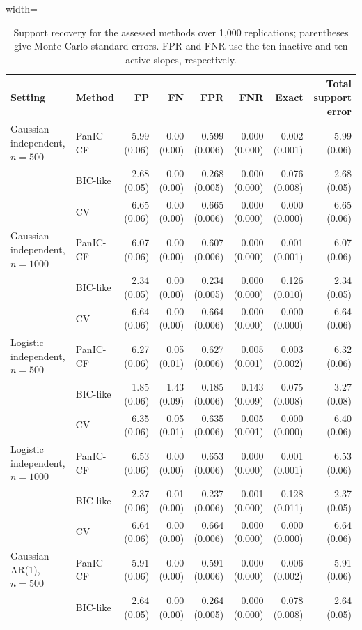 \begin{table}[H]
\centering
\caption{Support recovery for the assessed methods over 1,000 replications; parentheses give Monte Carlo standard errors. FPR and FNR use the ten inactive and ten active slopes, respectively.}
\label{Table: revised primary support}
\begin{adjustbox}{width=\textwidth}
\scriptsize
\begin{tabular}{llrrrrrr}
\hline
Setting & Method & FP & FN & FPR & FNR & Exact & Total support error \\
\hline
Gaussian independent, $n=500$ & PanIC-CF & 5.99 (0.06) & 0.00 (0.00) & 0.599 (0.006) & 0.000 (0.000) & 0.002 (0.001) & 5.99 (0.06) \\
 & BIC-like & 2.68 (0.05) & 0.00 (0.00) & 0.268 (0.005) & 0.000 (0.000) & 0.076 (0.008) & 2.68 (0.05) \\
 & CV & 6.65 (0.06) & 0.00 (0.00) & 0.665 (0.006) & 0.000 (0.000) & 0.000 (0.000) & 6.65 (0.06) \\
Gaussian independent, $n=1000$ & PanIC-CF & 6.07 (0.06) & 0.00 (0.00) & 0.607 (0.006) & 0.000 (0.000) & 0.001 (0.001) & 6.07 (0.06) \\
 & BIC-like & 2.34 (0.05) & 0.00 (0.00) & 0.234 (0.005) & 0.000 (0.000) & 0.126 (0.010) & 2.34 (0.05) \\
 & CV & 6.64 (0.06) & 0.00 (0.00) & 0.664 (0.006) & 0.000 (0.000) & 0.000 (0.000) & 6.64 (0.06) \\
Logistic independent, $n=500$ & PanIC-CF & 6.27 (0.06) & 0.05 (0.01) & 0.627 (0.006) & 0.005 (0.001) & 0.003 (0.002) & 6.32 (0.06) \\
 & BIC-like & 1.85 (0.06) & 1.43 (0.09) & 0.185 (0.006) & 0.143 (0.009) & 0.075 (0.008) & 3.27 (0.08) \\
 & CV & 6.35 (0.06) & 0.05 (0.01) & 0.635 (0.006) & 0.005 (0.001) & 0.000 (0.000) & 6.40 (0.06) \\
Logistic independent, $n=1000$ & PanIC-CF & 6.53 (0.06) & 0.00 (0.00) & 0.653 (0.006) & 0.000 (0.000) & 0.001 (0.001) & 6.53 (0.06) \\
 & BIC-like & 2.37 (0.06) & 0.01 (0.00) & 0.237 (0.006) & 0.001 (0.000) & 0.128 (0.011) & 2.37 (0.05) \\
 & CV & 6.64 (0.06) & 0.00 (0.00) & 0.664 (0.006) & 0.000 (0.000) & 0.000 (0.000) & 6.64 (0.06) \\
Gaussian AR(1), $n=500$ & PanIC-CF & 5.91 (0.06) & 0.00 (0.00) & 0.591 (0.006) & 0.000 (0.000) & 0.006 (0.002) & 5.91 (0.06) \\
 & BIC-like & 2.64 (0.05) & 0.00 (0.00) & 0.264 (0.005) & 0.000 (0.000) & 0.078 (0.008) & 2.64 (0.05) \\

\end{tabular}
\end{adjustbox}
\end{table}
